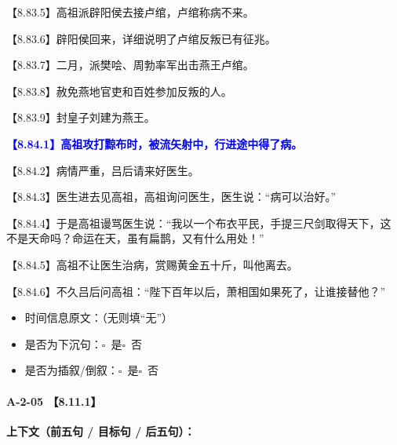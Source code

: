 \documentclass[fontset=none,11pt,a4paper]{ctexart}
\newcommand{\answerline}[1]{\underline{\hspace{#1}}}
\newcommand{\choicebox}[1]{$\square$~#1}
\begin{document}
\noindent 【8.83.5】高祖派辟阳侯去接卢绾，卢绾称病不来。\par
\noindent 【8.83.6】辟阳侯回来，详细说明了卢绾反叛已有征兆。\par
\noindent 【8.83.7】二月，派樊哙、周勃率军出击燕王卢绾。\par
\noindent 【8.83.8】赦免燕地官吏和百姓参加反叛的人。\par
\noindent 【8.83.9】封皇子刘建为燕王。\par
\noindent \textcolor{blue}{\textbf{【8.84.1】高祖攻打黥布时，被流矢射中，行进途中得了病。}}\par
\noindent 【8.84.2】病情严重，吕后请来好医生。\par
\noindent 【8.84.3】医生进去见高祖，高祖询问医生，医生说：“病可以治好。”\par
\noindent 【8.84.4】于是高祖谩骂医生说：“我以一个布衣平民，手提三尺剑取得天下，这不是天命吗？命运在天，虽有扁鹊，又有什么用处！”\par
\noindent 【8.84.5】高祖不让医生治病，赏赐黄金五十斤，叫他离去。\par
\noindent 【8.84.6】不久吕后问高祖：“陛下百年以后，萧相国如果死了，让谁接替他？”\par

\begin{itemize}
  \item 时间信息原文：\answerline{7.5cm}（无则填“无”）
  \item 是否为下沉句：\choicebox{是}\quad \choicebox{否}
  \item 是否为插叙/倒叙：\choicebox{是}\quad \choicebox{否}
\end{itemize}

\paragraph{A-2-05 \quad 【8.11.1】}
\textbf{上下文（前五句 / 目标句 / 后五句）：}
\end{document}
